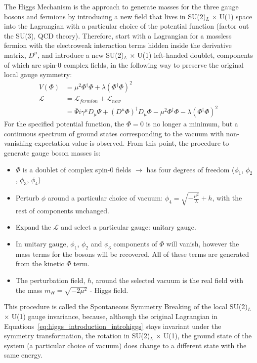 The Higgs Mechanism is the approach to generate masses for the three gauge bosons and fermions by introducing a new field that lives in SU(2)$_L$ $\times$ U(1) space into the Lagrangian with a particular choice of the potential function (factor out the SU(3), QCD theory). Therefore, start with a Lagrangian for a massless fermion with the electroweak interaction terms hidden inside the derivative matrix, $D^{\mu}$, and introduce a new SU(2)$_L$ $\times$ U(1) left-handed doublet, components of which are spin-0 complex fields, in the following way to preserve the original local gauge symmetry:
\begin{subequations}\label{eq:higgs_introduction_introhiggs}
\begin{align}
    V(\Phi)& = \mu^2\Phi^{\dagger}\Phi + \lambda(\Phi^{\dagger}\Phi)^2\\
    \mathcal{L}& = \mathcal{L}_{fermion} + \mathcal{L}_{new}\\
    & = \bar{\Psi}i\gamma^{\mu}D_{\mu}\Psi + (D^{\mu}\Phi)^{\dagger}D_{\mu}\Phi - \mu^2\Phi^{\dagger}\Phi - \lambda(\Phi^{\dagger}\Phi)^2
\end{align}
\end{subequations}
For the specified potential function, the $\Phi = 0$ is no longer a minimum, but a continuous spectrum of ground states corresponding to the vacuum with non-vanishing expectation value is observed. From this point, the procedure to generate gauge boson masses is:
\begin{itemize}
    \item $\Phi$ is a doublet of complex spin-0 fields $\rightarrow$ has four degrees of freedom ($\phi_1$, $\phi_2$, $\phi_3$, $\phi_4$)
    \item Perturb $\phi$ around a particular choice of vacuum: $\phi_4 = \sqrt{-\frac{\mu^2}{\lambda}} + h$, with the rest of components unchanged.
    \item Expand the $\mathcal{L}$ and select a particular gauge: unitary gauge.
    \item In unitary gauge, $\phi_1$, $\phi_2$ and $\phi_3$ components of $\Phi$ will vanish, however the mass terms for the bosons will be recovered. All of these terms are generated from the kinetic $\Phi$ term.
    \item The perturbation field, $h$, around the selected vacuum is the real field with the mass $m_H = \sqrt{-2\mu^2}$ - Higgs field.
\end{itemize}
This procedure is called the Spontaneous Symmetry Breaking of the local SU(2)$_L$ $\times$ U(1) gauge invariance, because, although the original Lagrangian in Equations~\ref{eq:higgs_introduction_introhiggs} stays invariant under the symmetry transformation, the rotation in SU(2)$_L$ $\times$ U(1), the ground state of the system (a particular choice of vacuum) does change to a different state with the same energy.

